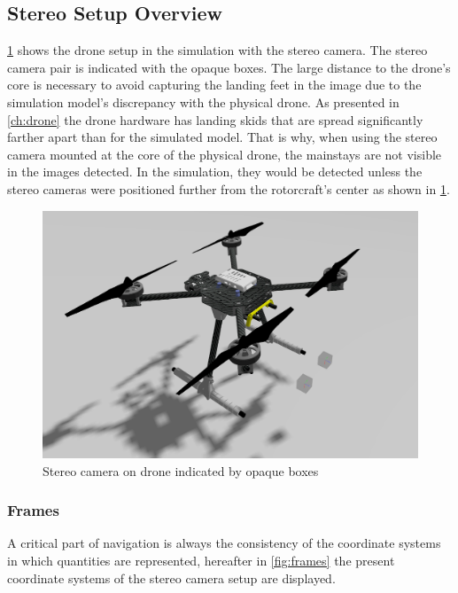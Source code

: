 \subsection{Stereo Setup Overview}

\cref{fig:drone_sim_setup} shows the drone setup in the simulation with the stereo camera. The stereo camera pair is indicated with the opaque boxes. The large distance to the drone's core is necessary to avoid capturing the landing feet in the image due to the simulation model's discrepancy with the physical drone. As presented in \cref{ch:drone} the drone hardware has landing skids that are spread significantly farther apart than for the simulated model. That is why, when using the stereo camera mounted at the core of the physical drone, the mainstays are not visible in the images detected. In the simulation, they would be detected unless the stereo cameras were positioned further from the rotorcraft's center as shown in \cref{fig:drone_sim_setup}. 

\clearpage %

\begin{figure}
    \centering
    \includegraphics[scale=0.32]{images/stereo_camera_depth/drone_with_stereo_cam.png}
    \caption{Stereo camera on drone indicated by opaque boxes}
    \label{fig:drone_sim_setup}
\end{figure}

\subsubsection{Frames}

A critical part of navigation is always the consistency of the coordinate systems in which quantities are represented, hereafter in \cref{fig:frames} the present coordinate systems of the stereo camera setup are displayed. 

